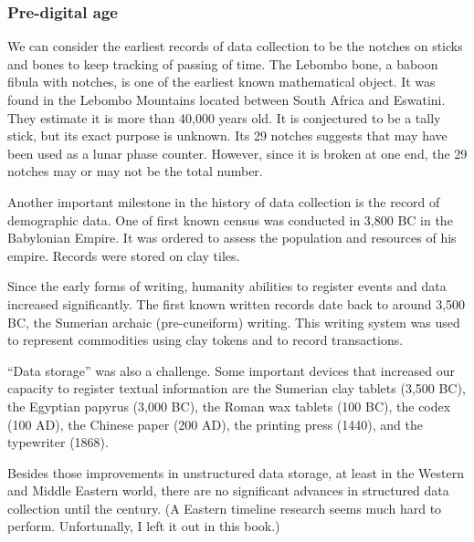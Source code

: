 \subsubsection{Pre-digital age}

We can consider the earliest records of data collection to be the notches on sticks and
bones to keep tracking of passing of time.  The Lebombo bone, a baboon fibula with
notches, is one of the earliest known mathematical object.  It was found in the Lebombo
Mountains located between South Africa and Eswatini.
They estimate it is more
than 40,000 years old. It is conjectured to be a tally stick, but its exact purpose is
unknown. Its 29 notches suggests that may have been used as a lunar phase counter.
However, since it is broken at one end, the 29 notches may or may not be the total
number.

Another important milestone in the history of data collection is the record of
demographic data.  One of first known census was conducted in 3,800 BC in the Babylonian
Empire.  It was ordered to assess the population and resources of
his empire.  Records were stored on  clay  tiles.

Since the early forms of writing, humanity abilities to register events and data
increased significantly.  The first known written records date back to around 3,500 BC, the
Sumerian archaic (pre-cuneiform) writing.  This writing system was used to represent
commodities using clay tokens and to record transactions.

``Data storage'' was also a challenge.  Some important devices that increased our capacity
to register textual information are the Sumerian clay tablets (3,500 BC), the Egyptian
papyrus (3,000 BC), the Roman wax tablets (100 BC), the codex
(100 AD), the Chinese paper (200 AD), the printing press (1440), and the typewriter (1868).


Besides those improvements in unstructured data storage, at least in the Western and
Middle Eastern world, there are no significant advances in structured data collection
until the  century.  (A Eastern timeline research seems much hard to perform.
Unfortunally, I left it out in this book.)

